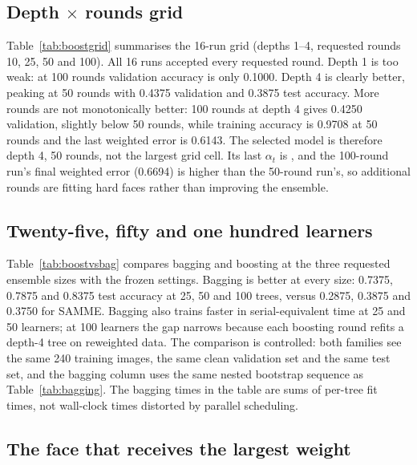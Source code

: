 \documentclass[10pt,twocolumn,letterpaper]{article}
\begin{document}


\subsection{Depth $\times$ rounds grid}

Table~\ref{tab:boostgrid} summarises the 16-run grid
(depths 1--4, requested rounds 10, 25, 50 and 100).  All 16 runs accepted every
requested round.  Depth 1 is too weak: at 100 rounds validation accuracy is only
0.1000.  Depth 4 is clearly better, peaking at 50 rounds with 0.4375 validation
and 0.3875 test accuracy.  More rounds are not monotonically better: 100 rounds
at depth 4 gives 0.4250 validation, slightly below 50 rounds, while training
accuracy is 0.9708 at 50 rounds and the last weighted error is 0.6143.  The
selected model is therefore depth 4, 50 rounds, not the largest grid cell.  Its
last $\alpha_t$ is \BoostAlphaLast, and the 100-round run's final weighted error
(0.6694) is higher than the 50-round run's, so additional rounds are fitting
hard faces rather than improving the ensemble.



\subsection{Twenty-five, fifty and one hundred learners}

Table~\ref{tab:boostvsbag} compares bagging and boosting at the three requested
ensemble sizes with the frozen settings.  Bagging is better at every size:
0.7375, 0.7875 and 0.8375 test accuracy at 25, 50 and 100 trees, versus 0.2875,
0.3875 and 0.3750 for SAMME.  Bagging also trains faster in serial-equivalent
time at 25 and 50 learners; at 100 learners the gap narrows because each
boosting round refits a depth-4 tree on reweighted data.  The comparison is
controlled: both families see the same 240 training images, the same clean
validation set and the same test set, and the bagging column uses the same
nested bootstrap sequence as Table~\ref{tab:bagging}.  The bagging times in the
table are sums of per-tree fit times, not wall-clock times distorted by
parallel scheduling.



\subsection{The face that receives the largest weight}
\end{document}
